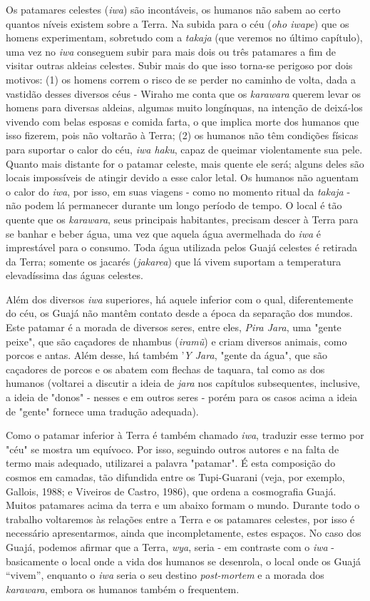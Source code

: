 Os patamares celestes (\emph{iwa}) são incontáveis, os humanos não sabem
ao certo quantos níveis existem sobre a Terra. Na subida para o céu
(\emph{oho iwape}) que os homens experimentam, sobretudo com a
\emph{takaja} (que veremos no último capítulo), uma vez no \emph{iwa}
conseguem subir para mais dois ou três patamares a fim de visitar outras
aldeias celestes. Subir mais do que isso torna-se perigoso por dois
motivos: (1) os homens correm o risco de se perder no caminho de volta,
dada a vastidão desses diversos céus - Wiraho me conta que os
\emph{karawara} querem levar os homens para diversas aldeias, algumas
muito longínquas, na intenção de deixá-los vivendo com belas esposas e
comida farta, o que implica morte dos humanos que isso fizerem, pois não
voltarão à Terra; (2) os humanos não têm condições físicas para suportar
o calor do céu, \emph{iwa haku}, capaz de queimar violentamente sua
pele. Quanto mais distante for o patamar celeste, mais quente ele será;
alguns deles são locais impossíveis de atingir devido a esse calor
letal. Os humanos não aguentam o calor do \emph{iwa}, por isso, em suas
viagens - como no momento ritual da \emph{takaja} - não podem lá
permanecer durante um longo período de tempo. O local é tão quente que
os \emph{karawara}, seus principais habitantes, precisam descer à Terra
para se banhar e beber água, uma vez que aquela água avermelhada do
\emph{iwa} é imprestável para o consumo. Toda água utilizada pelos Guajá
celestes é retirada da Terra; somente os jacarés (\emph{jakarea}) que lá
vivem suportam a temperatura elevadíssima das águas celestes.

Além dos diversos \emph{iwa} superiores, há aquele inferior com o qual,
diferentemente do céu, os Guajá não mantêm contato desde a época da
separação dos mundos. Este patamar é a morada de diversos seres, entre
eles, \emph{Pira Jara}, uma "gente peixe", que são caçadores de nhambus
(\emph{iramũ}) e criam diversos animais, como porcos e antas. Além
desse, há também '\emph{Y Jara}, "gente da água", que são caçadores de
porcos e os abatem com flechas de taquara, tal como as dos humanos
(voltarei a discutir a ideia de \emph{jara} nos capítulos subsequentes,
inclusive, a ideia de "donos" - nesses e em outros seres - porém para os
casos acima a ideia de "gente" fornece uma tradução adequada).

Como o patamar inferior à Terra é também chamado \emph{iwa}, traduzir
esse termo por "céu" se mostra um equívoco. Por isso, seguindo outros
autores e na falta de termo mais adequado, utilizarei a palavra
"patamar". É esta composição do cosmos em camadas, tão difundida entre
os Tupi-Guarani (veja, por exemplo, Gallois, 1988; e Viveiros de Castro,
1986), que ordena a cosmografia Guajá. Muitos patamares acima da terra e
um abaixo formam o mundo. Durante todo o trabalho voltaremos às relações
entre a Terra e os patamares celestes, por isso é necessário
apresentarmos, ainda que incompletamente, estes espaços. No caso dos
Guajá, podemos afirmar que a Terra, \emph{wya}, seria - em contraste com
o \emph{iwa} - basicamente o local onde a vida dos humanos se desenrola,
o local onde os Guajá ``vivem'', enquanto o \emph{iwa} seria o seu
destino \emph{post-mortem} e a morada dos \emph{karawara}, embora os
humanos também o frequentem.

